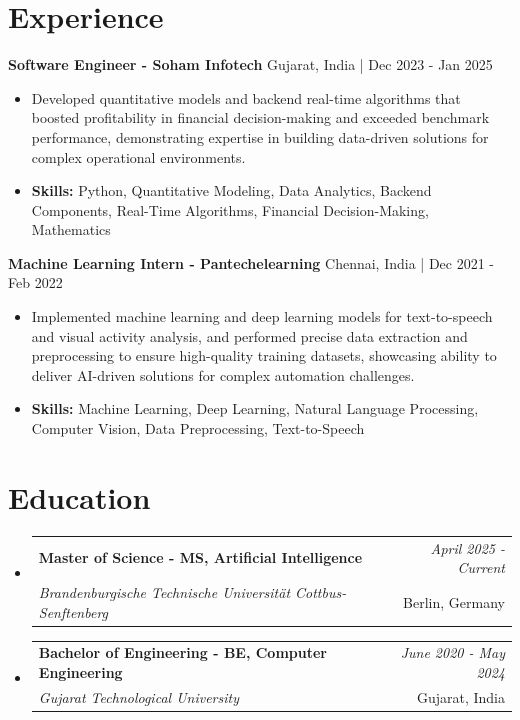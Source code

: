 \documentclass[a4paper,11pt]{article}
\makeatletter
\newcommand{\resumeSubheading}[4]{
\vspace{0.5mm}\item
    \begin{tabular*}{\linewidth}[t]{l@{\extracolsep{\fill}}r}
        \textbf{#1} & \textit{\footnotesize{#4}} \\
        \textit{\footnotesize{#3}} &  \footnotesize{#2}\\
    \end{tabular*}
    \vspace{-2.4mm}
}
\makeatother
\begin{document}
\section{\textbf{Experience}}


\vspace{1mm}
  \textbf{Software Engineer - Soham Infotech} \hfill Gujarat, India | Dec 2023 - Jan 2025
\vspace{-1.5mm} %
\begin{itemize}
  \item Developed quantitative models and backend real-time algorithms that boosted profitability in financial decision-making and exceeded benchmark performance, demonstrating expertise in building data-driven solutions for complex operational environments.

\vspace{-2mm}
  \item \textbf{Skills:} Python, Quantitative Modeling, Data Analytics, Backend Components, Real-Time Algorithms, Financial Decision-Making, Mathematics
\end{itemize}

\vspace{1mm}
  \textbf{Machine Learning Intern - Pantechelearning} \hfill Chennai, India | Dec 2021 - Feb 2022
\vspace{-1.5mm} %
\begin{itemize}
  \item Implemented machine learning and deep learning models for text-to-speech and visual activity analysis, and performed precise data extraction and preprocessing to ensure high-quality training datasets, showcasing ability to deliver AI-driven solutions for complex automation challenges.
\vspace{-2mm}
  \item \textbf{Skills:} Machine Learning, Deep Learning, Natural Language Processing, Computer Vision, Data Preprocessing, Text-to-Speech
\end{itemize}\section{\textbf{Education}}
\vspace{-0.4mm}

\begin{itemize}[leftmargin=0.15in, label={}]
\resumeSubheading
{Master of Science - MS, Artificial Intelligence }{Berlin, Germany}
{Brandenburgische Technische Universität Cottbus-Senftenberg  }{April 2025 - Current}

\vspace{1.0mm} %
\resumeSubheading
{Bachelor of Engineering - BE, Computer Engineering  }{Gujarat, India}
{Gujarat Technological University }{June 2020 - May 2024}

\end{itemize}
\end{document}
